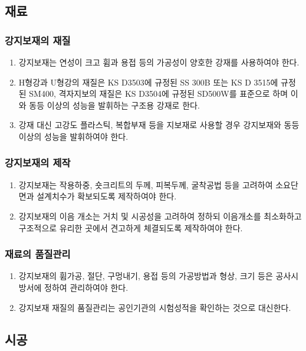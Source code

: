 \documentclass[12pt,a4paper]{article}
\begin{document}
\subsection{재료}

\subsubsection{강지보재의 재질}
\begin{enumerate}
\item 강지보재는 연성이 크고 휨과 용접 등의 가공성이 양호한 강재를 사용하여야 한다.  
\item H형강과 U형강의 재질은 KS D3503에 규정된 SS 300B 또는 KS D 3515에 규정된 SM400, 격자지보의 재질은 KS D3504에 규정된 SD500W를 표준으로 하며 이와 동등 이상의 성능을 발휘하는 구조용 강재로 한다.  
\item 강재 대신 고강도 플라스틱, 복합부재 등을 지보재로 사용할 경우 강지보재와 동등 이상의 성능을 발휘하여야 한다.   
\end{enumerate}

\subsubsection{강지보재의 제작}
\begin{enumerate}
\item 강지보재는 작용하중, 숏크리트의 두께, 피복두께, 굴착공법 등을 고려하여 소요단면과 설계치수가 확보되도록 제작하여야 한다.  
\item 강지보재의 이음 개소는 거치 및 시공성을 고려하여 정하되 이음개소를 최소화하고 구조적으로 유리한 곳에서 견고하게 체결되도록 제작하여야 한다.  
\end{enumerate}

\subsubsection{재료의 품질관리}
\begin{enumerate}
\item 강지보재의 휨가공, 절단, 구멍내기, 용접 등의 가공방법과 형상, 크기 등은 공사시방서에 정하여 관리하여야 한다.  
\item 강지보재 재질의 품질관리는 공인기관의 시험성적을 확인하는 것으로 대신한다.  
\end{enumerate}


\newpage
\subsection{시공}
\end{document}
